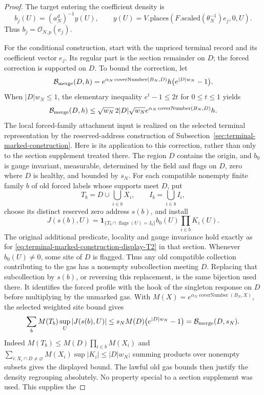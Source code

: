 \begin{proof}
The target entering the coefficient density is
\[
 b_j(U)=(a_N^d)^{-1}y(U),\qquad
 y(U)=V.\mathrm{places}(F.\mathrm{scaled}(\theta_N^{-1})e_j,0,U).
\]
Thus $b_j=\mathcal O_{N,p}(e_j)$.

For the conditional construction, start with the
unpriced terminal record and its coefficient vector $e_j$. Its regular
part is the section remainder on $D$; the forced correction is supported
on $D$. To bound the correction, let
\[
 \mathcal B_{\rm merge}(D,h)=e^{\alpha_N\operatorname{coverNumber}(B_N,D)}
 h\bigl(e^{|D|w_N}-1\bigr).
\]
When $|D|w_N\leq1$, the elementary inequality
$e^t-1\leq2t$ for $0\leq t\leq1$ yields
\[
 \mathcal B_{\rm merge}(D,h)
 \leq \sqrt{w_N}\,2|D|\sqrt{w_N}
       e^{\alpha_N\operatorname{coverNumber}(B_N,D)}h.
\]
The local forced-family attachment input is realized on the selected
terminal representation by the reserved-address construction of
Subsection~\ref{sec:terminal-marked-construction}. Here is its application
to this correction, rather than only to the section supplement treated
there. The region $D$ contains the origin, and $b_0$ is gauge invariant,
measurable, determined by the field and flags on $D$, zero where $D$ is
healthy, and bounded by $s_N$. For each compatible nonempty finite
family $b$ of old forced labels whose supports meet $D$, put
\[
 T_b=D\cup\bigcup_{i\in b}X_i,\qquad I_b=\bigcup_{i\in b}I_i,
\]
choose its distinct reserved zero address $s(b)$, and install
\[
 J(s(b),U)=\mathbf1_{\{T_b\cap\operatorname{flags}(U)=I_b\}}
                 b_0(U)\prod_{i\in b}K_i(U).
\]
The original additional predicate, locality and gauge invariance hold
exactly as for \eqref{eq:terminal-marked-construction-display-T2} in that section. Whenever $b_0(U)\ne0$, some site
of $D$ is flagged. Thus any old compatible collection contributing to
the gas has a nonempty subcollection meeting $D$. Replacing that
subcollection by $s(b)$, or reversing this replacement, is the same
bijection used there. It identifies the forced profile with the hook
of the singleton response on $D$ before multiplying by the unmarked
gas. With $M(X)=e^{\alpha_N\operatorname{coverNumber}(B_N,X)}$,
the selected weighted site bound gives
\[
 \sum_b M(T_b)\sup_U|J(s(b),U)|
 \le s_N M(D)\bigl(e^{|D|w_N}-1\bigr)
 =\mathcal B_{\rm merge}(D,s_N).
\]
Indeed $M(T_b)\le M(D)\prod_{i\in b}M(X_i)$ and
$\sum_{i:X_i\cap D\ne\varnothing}M(X_i)\sup|K_i|\le|D|w_N$;
summing products over nonempty subsets gives the displayed bound.
The lawful old gas bounds then justify the density regrouping absolutely.
No property special to a section supplement was used. This supplies the

\end{proof}
